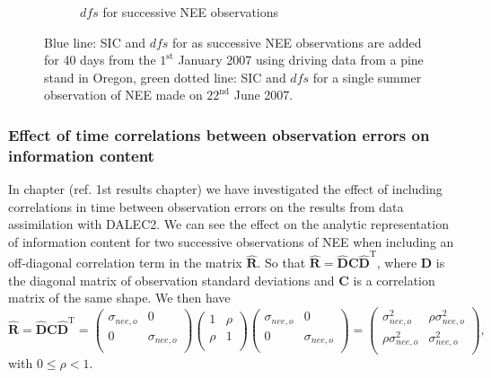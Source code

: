 \documentclass[11pt]{article}
\begin{document}
\begin{figure}[ht]
\begin{subfigure}[b]{0.45\textwidth}
        \caption{\(dfs\) for successive NEE observations}
        \label{fig:dfs_succ_nee}
    \end{subfigure}
    \caption{Blue line: SIC and \(dfs\) for as successive NEE observations are added for 40 days from the \(1^{\text{st}}\) January 2007 using driving data from a pine stand in Oregon, green dotted line: SIC and \(dfs\) for a single summer observation of NEE made on \( 22^{\text{nd}} \) June 2007. }
    \label{fig:ic_succ_nee}
\end{figure}

\subsubsection{Effect of time correlations between observation errors on information content}

In chapter ({\color{red}ref. 1st results chapter}) we have investigated the effect of including correlations in time between observation errors on the results from data assimilation with DALEC2. We can see the effect on the analytic representation of information content for two successive observations of NEE when including an off-diagonal correlation term in the matrix \(\hat{\mathbf{R}}\). So that \(\hat{\mathbf{R}} = \hat{\mathbf{D}}\mathbf{C}\hat{\mathbf{D}}^{\text{T}}\), where \(\hat{\mathbf{D}}\) is the diagonal matrix of observation standard deviations and \(\mathbf{C}\) is a correlation matrix of the same shape. We then have
\begin{equation}
\hat{\mathbf{R}} =  \hat{\mathbf{D}}\mathbf{C}\hat{\mathbf{D}}^{\text{T}} =
\begin{pmatrix}
\sigma_{nee,o} & 0  \\
0 & \sigma_{nee,o}  \\
\end{pmatrix}
\begin{pmatrix}
1 & \rho  \\
\rho & 1  \\
\end{pmatrix}
\begin{pmatrix}
\sigma_{nee,o} & 0  \\
0 & \sigma_{nee,o}  \\
\end{pmatrix}
=
\begin{pmatrix}
\sigma_{nee,o}^{2} & \rho\sigma_{nee,o}^{2}  \\
\rho\sigma_{nee,o}^{2} & \sigma_{nee,o}^{2}  \\
\end{pmatrix},
\end{equation}
with \(0 \leq \rho < 1\).
\end{document}
